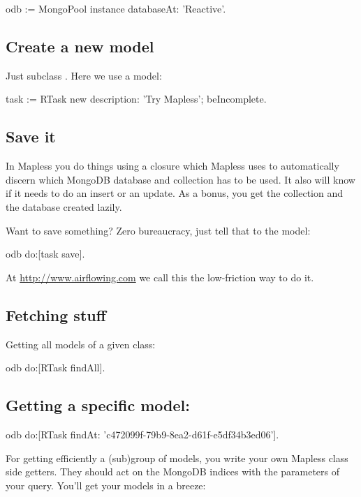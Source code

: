 \documentclass[a4paper,10pt,twoside]{book}
\begin{document}
\begin{code}{}
odb := MongoPool instance databaseAt: 'Reactive'.
\end{code}

\subsection{ Create a new model}
Just subclass . Here we use a  model:


\begin{code}{}
task := RTask new description: 'Try Mapless'; beIncomplete.
\end{code}

\subsection{ Save it}
In Mapless you do things using a  closure which Mapless uses to automatically discern which MongoDB database and collection has to be used. It also will know if it needs to do an insert or an update. As a bonus, you get the collection and the database created lazily.

Want to save something? Zero bureaucracy, just tell that to the model:


\begin{code}{}
odb do:[task save].
\end{code}


At \url{http://www.airflowing.com} we call this the low-friction way to do it.
\subsection{ Fetching stuff}
Getting all models of a given class:


\begin{code}{}
odb do:[RTask findAll].
\end{code}

\subsection{ Getting a specific model:}

\begin{code}{}
odb do:[RTask findAt: 'c472099f-79b9-8ea2-d61f-e5df34b3ed06'].
\end{code}


For getting efficiently a (sub)group of models, you write your own Mapless class side getters. They should act on the MongoDB indices with the parameters of your query. You'll get your models in a breeze:
\end{document}
